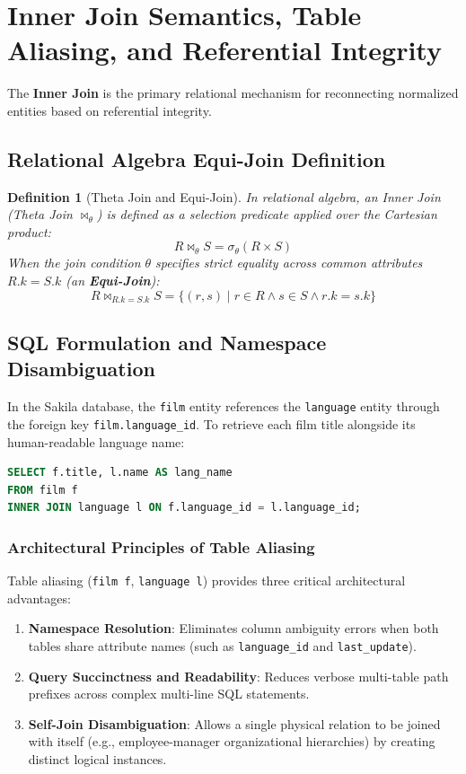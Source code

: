 \documentclass[10pt,twocolumn,letterpaper]{article}
\newtheorem{definition}[theorem]{Definition}
\begin{document}
\section{Inner Join Semantics, Table Aliasing, and Referential Integrity}
\label{sec:inner_join}

The \textbf{Inner Join} is the primary relational mechanism for reconnecting normalized entities based on referential integrity.

\subsection{Relational Algebra Equi-Join Definition}
\begin{definition}[Theta Join and Equi-Join]
In relational algebra, an Inner Join (Theta Join $\bowtie_\theta$) is defined as a selection predicate applied over the Cartesian product:
\begin{equation}
R \bowtie_\theta S = \sigma_\theta(R \times S)
\end{equation}
When the join condition $\theta$ specifies strict equality across common attributes $R.k = S.k$ (an \textbf{Equi-Join}):
\begin{equation}
R \bowtie_{R.k = S.k} S = \{ (r, s) \mid r \in R \land s \in S \land r.k = s.k \}
\end{equation}
\end{definition}

\subsection{SQL Formulation and Namespace Disambiguation}
In the Sakila database, the \texttt{film} entity references the \texttt{language} entity through the foreign key \texttt{film.language\_id}. To retrieve each film title alongside its human-readable language name:
\begin{lstlisting}[language=SQL]
SELECT f.title, l.name AS lang_name
FROM film f
INNER JOIN language l ON f.language_id = l.language_id;
\end{lstlisting}

\subsubsection{Architectural Principles of Table Aliasing}
Table aliasing (\texttt{film f}, \texttt{language l}) provides three critical architectural advantages:
\begin{enumerate}
    \item \textbf{Namespace Resolution}: Eliminates column ambiguity errors when both tables share attribute names (such as \texttt{language\_id} and \texttt{last\_update}).
    \item \textbf{Query Succinctness and Readability}: Reduces verbose multi-table path prefixes across complex multi-line SQL statements.
    \item \textbf{Self-Join Disambiguation}: Allows a single physical relation to be joined with itself (e.g., employee-manager organizational hierarchies) by creating distinct logical instances.
\end{enumerate}
\end{document}
